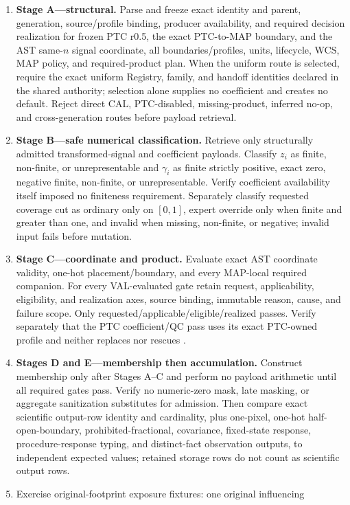 \documentclass[10pt]{article}
\begin{document}
\begin{enumerate}
\item \textbf{Stage A---structural.} Parse and freeze exact identity and
parent, generation, source/profile binding, producer availability, and
required decision realization for frozen PTC r0.5, the exact PTC-to-MAP
boundary, and the AST same-\(n\) signal
coordinate, all boundaries/profiles, units, lifecycle, WCS, MAP policy, and
required-product plan.  When the uniform route is selected, require the exact
uniform Registry, family, and handoff identities declared in the shared
authority; selection alone supplies no coefficient and creates no default.
Reject direct CAL, PTC-disabled, missing-product,
inferred no-op, and cross-generation routes before payload retrieval.
\item \textbf{Stage B---safe numerical classification.} Retrieve only
structurally admitted transformed-signal and coefficient payloads. Classify
\(z_i\) as finite, non-finite, or unrepresentable and \(\gamma_i\) as finite
strictly positive, exact zero, negative finite, non-finite, or
unrepresentable. Verify coefficient availability itself imposed no finiteness
requirement.  Separately classify requested coverage cut as ordinary only on
\([0,1]\), expert override only when finite and greater than one, and invalid
when missing, non-finite, or negative; invalid input fails before mutation.
\item \textbf{Stage C---coordinate and product.} Evaluate exact AST coordinate
validity, one-hot placement/boundary, and every MAP-local required companion.
For every VAL-evaluated gate retain request, applicability, eligibility, and
realization axes, source binding, immutable reason, cause, and failure scope.
Only requested/applicable/eligible/realized passes. Verify separately that the
PTC coefficient/QC pass uses its exact PTC-owned profile and neither replaces
nor rescues \SCIMapUpstreamProfile.
\item \textbf{Stages D and E---membership then accumulation.} Construct
membership only after Stages A--C and perform no payload arithmetic until all
required gates pass. Verify no numeric-zero mask, late masking, or aggregate
sanitization substitutes for admission. Then compare exact scientific
output-row identity and cardinality, plus
one-pixel, one-hot half-open-boundary, prohibited-fractional, covariance,
fixed-state response, procedure-response typing, and distinct-fact
observation outputs, to independent expected values; retained storage rows do
not count as scientific output rows.
\item Exercise original-footprint exposure fixtures: one original influencing

\end{enumerate}
\end{document}
